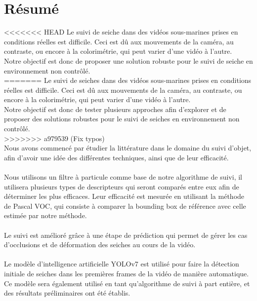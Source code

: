 \pagestyle{plain}
\chapter*{Résumé}
<<<<<<< HEAD
Le suivi de seiche dans des vidéos sous-marines prises en conditions réelles est difficile. Ceci est dû aux mouvements de la caméra, au contraste, ou encore à la colorimétrie, qui peut varier d'une vidéo à l'autre.\\
Notre objectif est donc de proposer une solution robuste pour le suivi de seiche en environnement non contrôlé.\\
=======
Le suivi de seiches dans des vidéos sous-marines prises en conditions réelles est difficile. Ceci est dû aux mouvements de la caméra, au contraste, ou encore à la colorimétrie, qui peut varier d'une vidéo à l'autre.\\
Notre objectif est donc de tester plusieurs approches afin d'explorer et de proposer des solutions robustes pour le suivi de seiches en environnement non contrôlé.\\
>>>>>>> a979539 (Fix typos)
\\
Nous avons commencé par étudier la littérature dans le domaine du suivi d'objet, afin d'avoir une idée des différentes techniques, ainsi que de leur efficacité.\\
\\
Nous utilisons un filtre à particule comme base de notre algorithme de suivi, il utilisera plusieurs types de descripteurs qui seront comparés entre eux afin de déterminer les plus efficaces. Leur efficacité est mesurée en utilisant la méthode de Pascal VOC, qui consiste à comparer la bounding box de référence avec celle estimée par notre méthode.\\
\\
Le suivi est amélioré grâce à une étape de prédiction qui permet de gérer les cas d'occlusions et de déformation des seiches au cours de la vidéo.\\
\\
Le modèle d'intelligence artificielle YOLOv7 est utilisé pour faire la détection initiale de seiches dans les premières frames de la vidéo de manière automatique.\\
Ce modèle sera également utilisé en tant qu'algorithme de suivi à part entière, et des résultats préliminaires ont été établis.\\


\clearpage
